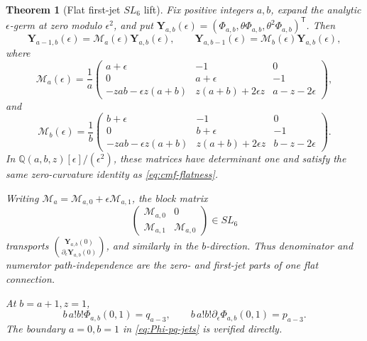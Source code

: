 \documentclass[11pt]{article}
\newtheorem{theorem}{Theorem}[section]
\theoremstyle{definition}
\theoremstyle{remark}
\newcommand{\Q}{\mathbb Q}
\begin{document}
\begin{theorem}[Flat first-jet \(SL_6\) lift]
\label{thm:ram-sl6}
Fix positive integers \(a,b\), expand the analytic \(\epsilon\)-germ at
zero modulo \(\epsilon^2\), and put
\(\mathbf Y_{a,b}(\epsilon)
=(\Phi_{a,b},\theta\Phi_{a,b},\theta^2\Phi_{a,b})^{\mathsf T}\).
Then
\begin{equation}\label{eq:epsilon-contiguous}
 \mathbf Y_{a-1,b}(\epsilon)=\mathscr M_a(\epsilon)\mathbf Y_{a,b}(\epsilon),
 \qquad
 \mathbf Y_{a,b-1}(\epsilon)=\mathscr M_b(\epsilon)\mathbf Y_{a,b}(\epsilon),
\end{equation}
where
\begin{equation}\label{eq:epsilon-Ma}
 \mathscr M_a(\epsilon)=\frac1a
 \begin{pmatrix}
 a+\epsilon&-1&0\\
 0&a+\epsilon&-1\\
 -zab-\epsilon z(a+b)&z(a+b)+2\epsilon z&a-z-2\epsilon
 \end{pmatrix},
\end{equation}
and
\begin{equation}\label{eq:epsilon-Mb}
 \mathscr M_b(\epsilon)=\frac1b
 \begin{pmatrix}
 b+\epsilon&-1&0\\
 0&b+\epsilon&-1\\
 -zab-\epsilon z(a+b)&z(a+b)+2\epsilon z&b-z-2\epsilon
 \end{pmatrix}.
\end{equation}
In
\(\Q(a,b,z)[\epsilon]/(\epsilon^2)\), these matrices have determinant one
and satisfy the same zero-curvature identity as
\eqref{eq:cmf-flatness}.

Writing
\(\mathscr M_a=\mathscr M_{a,0}+\epsilon\mathscr M_{a,1}\), the block matrix
\begin{equation}\label{eq:SL6-block}
 \begin{pmatrix}
 \mathscr M_{a,0}&0\\
 \mathscr M_{a,1}&\mathscr M_{a,0}
 \end{pmatrix}\in SL_6
\end{equation}
transports
\(\binom{\mathbf Y_{a,b}(0)}
{\partial_\epsilon\mathbf Y_{a,b}(0)}\), and similarly in the
\(b\)-direction.  Thus denominator and numerator path-independence are the
zero- and first-jet parts of one flat connection.

At \(b=a+1,z=1\),
\begin{equation}\label{eq:Phi-pq-jets}
 b\,a!b!\Phi_{a,b}(0,1)=q_{a-3},\qquad
 b\,a!b!\partial_\epsilon\Phi_{a,b}(0,1)=p_{a-3}.
\end{equation}
The boundary \(a=0,b=1\) in \eqref{eq:Phi-pq-jets} is verified directly.
\end{theorem}
\end{document}
